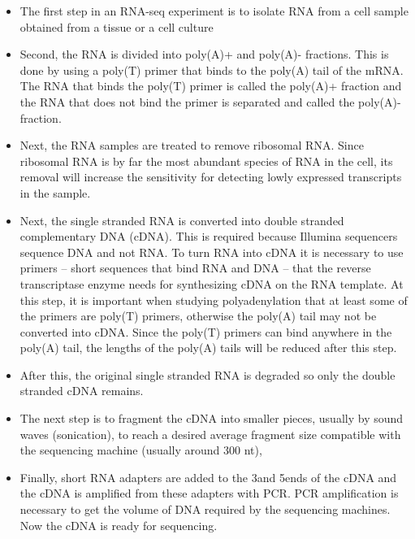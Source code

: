 \begin{itemize}
	\item The first step in an RNA-seq experiment is to isolate RNA from a cell
		sample obtained from a tissue or a cell culture

	\item Second, the RNA is divided into poly(A)+ and poly(A)- fractions. This
		is done by using a poly(T) primer that binds to the poly(A) tail of the
		mRNA. The RNA that binds the poly(T) primer is called the poly(A)+
		fraction and the RNA that does not bind the primer is separated and
		called the poly(A)- fraction.

	\item Next, the RNA samples are treated to remove ribosomal RNA. Since
		ribosomal RNA is by far the most abundant species of RNA in the cell,
		its removal will increase the sensitivity for detecting lowly expressed
		transcripts in the sample.

	\item Next, the single stranded RNA is converted into double stranded
		complementary DNA (cDNA). This is required because Illumina sequencers
		sequence DNA and not RNA. To turn RNA into cDNA it is necessary to use
		primers -- short sequences that bind RNA and DNA -- that the reverse
		transcriptase enzyme needs for synthesizing cDNA on the RNA template.
		At this step, it is important when studying polyadenylation that at
		least some of the primers are poly(T) primers, otherwise the poly(A)
		tail may not be converted into cDNA. Since the poly(T) primers can
		bind anywhere in the poly(A) tail, the lengths of the poly(A) tails
		will be reduced after this step.

	\item After this, the original single stranded RNA is degraded so only the
		double stranded cDNA remains.

	\item The next step is to fragment the cDNA into smaller pieces, usually by
		sound waves (sonication), to reach a desired average fragment size
		compatible with the sequencing machine (usually around 300 nt),

	\item Finally, short RNA adapters are added to the 3\p and 5\p ends of the
		cDNA and the cDNA is amplified from these adapters with PCR.  PCR
		amplification is necessary to get the volume of DNA required by the
		sequencing machines. Now the cDNA is ready for sequencing.

\end{itemize}

